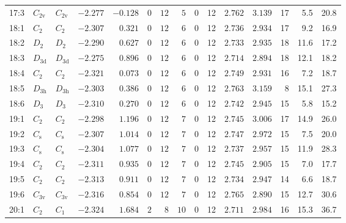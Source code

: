 \begin{table}[htbp]
{\begin{tabular}{lllrrrrrrrrrrrr}
17:3    & $C_\mathrm{2v}$ & $C_\mathrm{2v}$ & $-2.277$ & $-0.128$ & $0$ & $12$ & $5$      & $0$ & 12  & $2.762$ & $3.139$ & 17  & 5.5  & 20.8  \\
18:1    & $C_\mathrm{2}$  & $C_\mathrm{2 }$ & $-2.307$ & $0.321$  & $0$ & $12$ & $6$      & $0$ & 12  & $2.736$ & $2.934$ & 17  & 9.2  & 16.9  \\
18:2    & $D_\mathrm{2}$  & $D_\mathrm{2 }$ & $-2.290$ & $0.627$  & $0$ & $12$ & $6$      & $0$ & 12  & $2.733$ & $2.935$ & 18  & 11.6 & 17.2  \\
18:3    & $D_\mathrm{3d}$ & $D_\mathrm{3d}$ & $-2.275$ & $0.896$  & $0$ & $12$ & $6$      & $0$ & 12  & $2.714$ & $2.894$ & 18  & 12.1 & 18.2  \\
18:4    & $C_\mathrm{2}$  & $C_\mathrm{2 }$ & $-2.321$ & $0.073$  & $0$ & $12$ & $6$      & $0$ & 12  & $2.749$ & $2.931$ & 16  & 7.2  & 18.7  \\
18:5    & $D_\mathrm{3h}$ & $D_\mathrm{3h}$ & $-2.303$ & $0.386$  & $0$ & $12$ & $6$      & $0$ & 12  & $2.763$ & $3.159$ & 8   & 15.1 & 27.3  \\
18:6    & $D_\mathrm{3}$  & $D_\mathrm{3 }$ & $-2.310$ & $0.270$  & $0$ & $12$ & $6$      & $0$ & 12  & $2.742$ & $2.945$ & 15  & 5.8  & 15.2  \\
19:1    & $C_\mathrm{2}$  & $C_\mathrm{2 }$ & $-2.298$ & $1.196$  & $0$ & $12$ & $7$      & $0$ & 12  & $2.745$ & $3.006$ & 17  & 14.9 & 26.0  \\
19:2    & $C_\mathrm{s}$  & $C_\mathrm{s }$ & $-2.307$ & $1.014$  & $0$ & $12$ & $7$      & $0$ & 12  & $2.747$ & $2.972$ & 15  & 7.5  & 20.0  \\
19:3    & $C_\mathrm{s}$  & $C_\mathrm{s }$ & $-2.304$ & $1.077$  & $0$ & $12$ & $7$      & $0$ & 12  & $2.737$ & $2.957$ & 15  & 11.9 & 28.3  \\
19:4    & $C_\mathrm{2}$  & $C_\mathrm{2 }$ & $-2.311$ & $0.935$  & $0$ & $12$ & $7$      & $0$ & 12  & $2.745$ & $2.905$ & 15  & 7.0  & 17.7  \\
19:5    & $C_\mathrm{2}$  & $C_\mathrm{2 }$ & $-2.313$ & $0.911$  & $0$ & $12$ & $7$      & $0$ & 12  & $2.734$ & $2.947$ & 14  & 6.6  & 18.7  \\
19:6    & $C_\mathrm{3v}$ & $C_\mathrm{3v}$ & $-2.316$ & $0.854$  & $0$ & $12$ & $7$      & $0$ & 12  & $2.765$ & $2.890$ & 15  & 12.7 & 30.6  \\
20:1    & $C_\mathrm{2}$  & $C_\mathrm{1 }$ & $-2.324$ & $1.684$  & $2$ & $8$  & $10$     & $0$ & 12  & $2.711$ & $2.984$ & 16  & 15.3 & 36.7  \\

\end{tabular}}
\end{table}
